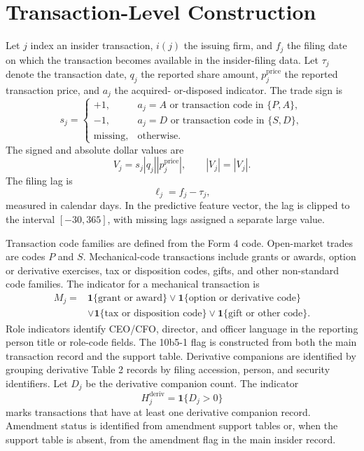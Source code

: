 \documentclass[11pt]{article}
\newcommand{\one}{\mathbf{1}}
\begin{document}
\section{Transaction-Level Construction}

Let $j$ index an insider transaction, $i(j)$ the issuing firm, and $f_j$ the
filing date on which the transaction becomes available in the insider-filing
data. Let $\tau_j$ denote the transaction date, $q_j$ the reported share amount,
$p^{\mathrm{price}}_j$ the reported transaction price, and $a_j$ the acquired-
or-disposed indicator. The trade sign is
\begin{equation}
s_j =
\begin{cases}
+1, & a_j=A \text{ or transaction code in } \{P,A\},\\
-1, & a_j=D \text{ or transaction code in } \{S,D\},\\
\mathrm{missing}, & \text{otherwise.}
\end{cases}
\end{equation}
The signed and absolute dollar values are
\begin{equation}
V_j = s_j |q_j| |p^{\mathrm{price}}_j|,\qquad |V_j|=|V_j|.
\end{equation}
The filing lag is
\begin{equation}
\ell_j = f_j-\tau_j,
\end{equation}
measured in calendar days. In the predictive feature vector, the lag is clipped
to the interval $[-30,365]$, with missing lags assigned a separate large value.

Transaction code families are defined from the Form 4 code. Open-market trades
are codes $P$ and $S$. Mechanical-code transactions include grants or awards,
option or derivative exercises, tax or disposition codes, gifts, and other
non-standard code families. The indicator for a mechanical transaction is
\begin{align}
M_j ={}&
\one\{\text{grant or award}\}
\vee \one\{\text{option or derivative code}\} \nonumber\\
&\vee \one\{\text{tax or disposition code}\}
\vee \one\{\text{gift or other code}\}.
\end{align}
Role indicators identify CEO/CFO, director, and officer language in the reporting
person title or role-code fields. The 10b5-1 flag is constructed from both the
main transaction record and the support table. Derivative companions are
identified by grouping derivative Table 2 records by filing accession, person,
and security identifiers. Let $D_j$ be the derivative companion count. The
indicator
\begin{equation}
H^{\mathrm{deriv}}_j=\one\{D_j>0\}
\end{equation}
marks transactions that have at least one derivative companion record.
Amendment status is identified from amendment support tables or, when the
support table is absent, from the amendment flag in the main insider record.
\end{document}
